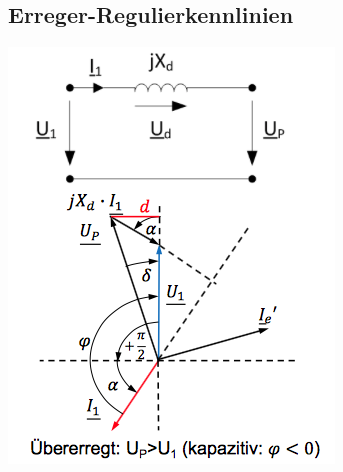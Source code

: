 \subsection{Erreger-Regulierkennlinien}
\begin{minipage}{0.25 \linewidth}
\includegraphics[width =  \linewidth]{./Pics/VL1011/Leistung}
\end{minipage}
